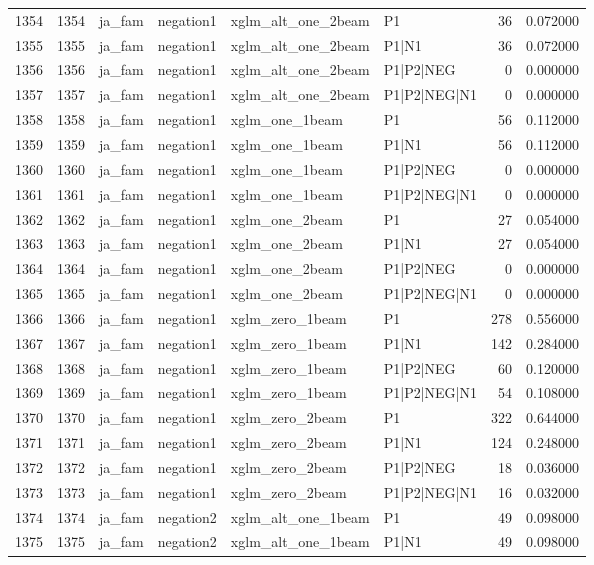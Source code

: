 \begin{tabular}{lrllllrr}
1354 & 1354 & ja_fam & negation1 & xglm_alt_one_2beam & P1 & 36 & 0.072000 \\
1355 & 1355 & ja_fam & negation1 & xglm_alt_one_2beam & P1|N1 & 36 & 0.072000 \\
1356 & 1356 & ja_fam & negation1 & xglm_alt_one_2beam & P1|P2|NEG & 0 & 0.000000 \\
1357 & 1357 & ja_fam & negation1 & xglm_alt_one_2beam & P1|P2|NEG|N1 & 0 & 0.000000 \\
1358 & 1358 & ja_fam & negation1 & xglm_one_1beam & P1 & 56 & 0.112000 \\
1359 & 1359 & ja_fam & negation1 & xglm_one_1beam & P1|N1 & 56 & 0.112000 \\
1360 & 1360 & ja_fam & negation1 & xglm_one_1beam & P1|P2|NEG & 0 & 0.000000 \\
1361 & 1361 & ja_fam & negation1 & xglm_one_1beam & P1|P2|NEG|N1 & 0 & 0.000000 \\
1362 & 1362 & ja_fam & negation1 & xglm_one_2beam & P1 & 27 & 0.054000 \\
1363 & 1363 & ja_fam & negation1 & xglm_one_2beam & P1|N1 & 27 & 0.054000 \\
1364 & 1364 & ja_fam & negation1 & xglm_one_2beam & P1|P2|NEG & 0 & 0.000000 \\
1365 & 1365 & ja_fam & negation1 & xglm_one_2beam & P1|P2|NEG|N1 & 0 & 0.000000 \\
1366 & 1366 & ja_fam & negation1 & xglm_zero_1beam & P1 & 278 & 0.556000 \\
1367 & 1367 & ja_fam & negation1 & xglm_zero_1beam & P1|N1 & 142 & 0.284000 \\
1368 & 1368 & ja_fam & negation1 & xglm_zero_1beam & P1|P2|NEG & 60 & 0.120000 \\
1369 & 1369 & ja_fam & negation1 & xglm_zero_1beam & P1|P2|NEG|N1 & 54 & 0.108000 \\
1370 & 1370 & ja_fam & negation1 & xglm_zero_2beam & P1 & 322 & 0.644000 \\
1371 & 1371 & ja_fam & negation1 & xglm_zero_2beam & P1|N1 & 124 & 0.248000 \\
1372 & 1372 & ja_fam & negation1 & xglm_zero_2beam & P1|P2|NEG & 18 & 0.036000 \\
1373 & 1373 & ja_fam & negation1 & xglm_zero_2beam & P1|P2|NEG|N1 & 16 & 0.032000 \\
1374 & 1374 & ja_fam & negation2 & xglm_alt_one_1beam & P1 & 49 & 0.098000 \\
1375 & 1375 & ja_fam & negation2 & xglm_alt_one_1beam & P1|N1 & 49 & 0.098000 \\

\end{tabular}
